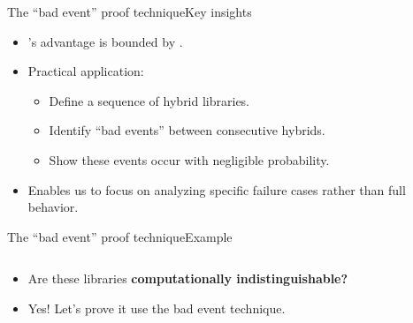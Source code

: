 \documentclass[aspectratio=169, lualatex, handout]{beamer}
\begin{document}
\begin{frame}{The ``bad event'' proof technique}{Key insights}
	\begin{itemize}
		\item \prog{}'s advantage is bounded by .
		\item Practical application:
		      \begin{itemize}
			      \item Define a sequence of hybrid libraries.
			      \item Identify ``bad events'' between consecutive hybrids.
			      \item Show these events occur with negligible probability.
		      \end{itemize}
		\item Enables us to focus on analyzing specific failure cases rather than full behavior.
	\end{itemize}
\end{frame}

\begin{frame}{The ``bad event'' proof technique}{Example}
	\begin{columns}[c]
		\begin{column}{0.5\textwidth}
			\begin{itemize}[<+->]
				\item Are these libraries \textbf{computationally indistinguishable?}
				\item Yes! Let's prove it use the bad event technique.
			\end{itemize}
		\end{column}
		\begin{column}{0.5\textwidth}
		\end{column}
	\end{columns}
\end{frame}
\end{document}
